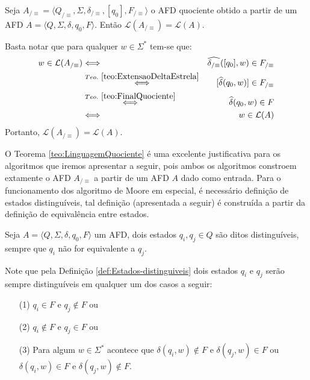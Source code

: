 \begin{teorema}\label{teo:LinguagemQuociente}
	Seja  $A_{/\equiv} = \langle Q_{/\equiv}, \Sigma, \delta_{/\equiv}, [q_0],  F_{/\equiv}\rangle$ o AFD quociente obtido a partir de um AFD $A = \langle Q, \Sigma, \delta, q_0, F\rangle$. Então $\mathcal{L}(A_{/\equiv}) = \mathcal{L}(A)$.
\end{teorema}

\begin{prova}
	Basta notar que para qualquer $w \in \Sigma^*$ tem-se que:
	\begin{eqnarray*}
		w \in \mathcal{L}(A_{/\equiv}) & \Longleftrightarrow & \widehat{\delta_{/\equiv}}([q_0], w) \in F_{/\equiv}\\
		& \stackrel{Teo. \ \ref{teo:ExtensaoDeltaEstrela}}{\Longleftrightarrow} & [\widehat{\delta}(q_0, w)] \in F_{/\equiv}\\
		& \stackrel{Teo. \ \ref{teo:FinalQuociente}}{\Longleftrightarrow} & \widehat{\delta}(q_0, w) \in F\\
		& \Longleftrightarrow & w \in \mathcal{L}(A)
	\end{eqnarray*}
	Portanto, $\mathcal{L}(A_{/\equiv}) = \mathcal{L}(A)$.
\end{prova}

O Teorema \ref{teo:LinguagemQuociente} é uma excelente justificativa para os algoritmos que iremos apresentar a seguir, pois ambos os algoritmos constroem extamente o AFD  $A_{/\equiv}$ a partir de um AFD $A$ dado como entrada. Para o funcionamento dos algoritmo de Moore em especial, é necessário definição de estados distinguíveis, tal definição (apresentada a seguir) é construída a partir da definição de equivalência entre estados.

\begin{definicao}\label{def:Estados-distinguiveis}
	Seja $A = \langle Q, \Sigma, \delta, q_0, F\rangle$ um AFD, dois estados $q_i, q_j \in Q$ são ditos distinguíveis, sempre que $q_i$ não for equivalente a $q_j$.
\end{definicao}

Note que pela Definição \ref{def:Estados-distinguiveis} dois estados $q_i$ e $q_j$ serão sempre distinguíveis em qualquer um dos casos a seguir:

\begin{itemize}
	\item[(1)] $q_i \in F$ e $q_j \notin F$ ou
	\item[(2)] $q_i \notin F$ e $q_j \in F$ ou
	\item[(3)] Para algum $w \in \Sigma^*$ acontece que $\delta(q_i, w) \notin F$ e $\delta(q_j, w) \in F$ ou $\delta(q_i, w) \in F$ e $\delta(q_j, w) \notin F$.
\end{itemize}

